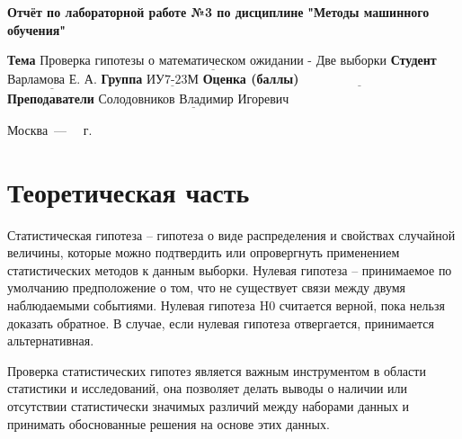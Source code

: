 \documentclass[12pt]{report}
\begin{document}
\begin{titlepage}
	
	\begin{center}
		\noindent\begin{minipage}{1.3\textwidth}\centering
			\Large\textbf{  Отчёт по лабораторной работе №3 по дисциплине}\newline
			\textbf{ "Методы машинного обучения"}\newline\newline
		\end{minipage}
	\end{center}
	
	\noindent\textbf{Тема} $\underline{\text{Проверка гипотезы о математическом ожидании - Две выборки}}$\newline\newline
	\noindent\textbf{Студент} $\underline{\text{Варламова Е. А.}}$\newline\newline
	\noindent\textbf{Группа} $\underline{\text{ИУ7-23М}}$\newline\newline
	\noindent\textbf{Оценка (баллы)} $\underline{\text{~~~~~~~~~~~~~~~~~~~~~~~~~~~}}$\newline\newline
	\noindent\textbf{Преподаватели} $\underline{\text{Солодовников Владимир Игоревич}}$\newline\newline\newline
	
	\begin{center}
		\vfill
		Москва~---~\the\year
		~г.
	\end{center}
\end{titlepage}
\large
\setcounter{page}{2}
\def\contentsname{СОДЕРЖАНИЕ}
\renewcommand{\contentsname}{СОДЕРЖАНИЕ}
\tableofcontents
\renewcommand\labelitemi{---}
\newpage
\chapter{Теоретическая часть}

Статистическая гипотеза -- гипотеза о виде распределения и свойствах случайной величины, которые можно подтвердить или опровергнуть применением статистических методов к данным выборки. Нулевая гипотеза -- принимаемое по умолчанию предположение о том, что не существует связи между двумя наблюдаемыми событиями. Нулевая гипотеза H0 считается верной, пока нельзя доказать обратное. В случае, если нулевая гипотеза отвергается, принимается альтернативная.

Проверка статистических гипотез является важным инструментом в области статистики и исследований, она позволяет делать выводы о наличии или отсутствии статистически значимых различий между наборами данных и принимать обоснованные решения на основе этих данных.
\end{document}
